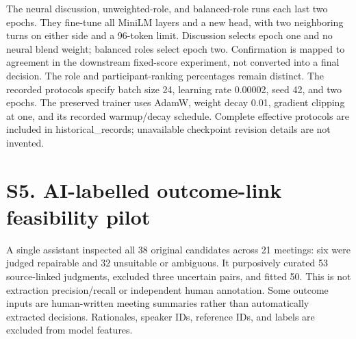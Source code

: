 \documentclass[journal,onecolumn]{IEEEtran}
\begin{document}
The neural discussion, unweighted-role, and balanced-role runs each last two epochs. They fine-tune all MiniLM layers and a new head, with two neighboring turns on either side and a 96-token limit. Discussion selects epoch one and no neural blend weight; balanced roles select epoch two. Confirmation is mapped to agreement in the downstream fixed-score experiment, not converted into a final decision. The role and participant-ranking percentages remain distinct. The recorded protocols specify batch size 24, learning rate 0.00002, seed 42, and two epochs. The preserved trainer uses AdamW, weight decay 0.01, gradient clipping at one, and its recorded warmup/decay schedule. Complete effective protocols are included in historical\_\allowbreak{}records; unavailable checkpoint revision details are not invented.

\section*{S5. AI-labelled outcome-link feasibility pilot}
A single assistant inspected all 38 original candidates across 21 meetings: six were judged repairable and 32 unsuitable or ambiguous. It purposively curated 53 source-linked judgments, excluded three uncertain pairs, and fitted 50. This is not extraction precision/recall or independent human annotation. Some outcome inputs are human-written meeting summaries rather than automatically extracted decisions. Rationales, speaker IDs, reference IDs, and labels are excluded from model features.
\end{document}
